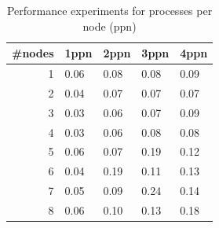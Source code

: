 \documentclass[11pt]{article}
\begin{document}
\begin{table}[]
    \centering
\begin{tabular}{|r|l|l|l|l|}
\hline
\multicolumn{1}{|c|}{\#nodes} & \multicolumn{1}{c|}{1ppn} & \multicolumn{1}{c|}{2ppn} & \multicolumn{1}{c|}{3ppn} & \multicolumn{1}{c|}{4ppn} \\ \hline
1                            &      0.06                     &               0.08            &0.08                           & 0.09                           \\ \hline
2                            &        0.04                   &             0.07              &    0.07                       &    0.07                       \\ \hline
3                            &       0.03                    &              0.06             &   0.07                        &    0.09                       \\ \hline
4                            &         0.03                  &      0.06                     &   0.08                        & 0.08                           \\ \hline
5                            &    0.06                       & 0.07                           &   0.19                        & 0.12                           \\ \hline
6                            &      0.04                     & 0.19                           & 0.11                           & 0.13                           \\ \hline
7                            & 0.05                           & 0.09                           & 0.24                           & 0.14                           \\ \hline
8                            & 0.06                           & 0.10                           & 0.13                           & 0.18                           \\ \hline

\end{tabular}
\caption{Performance experiments for processes per node (ppn)}
\label{tab:mpi-omp}
\end{table}
\end{document}

